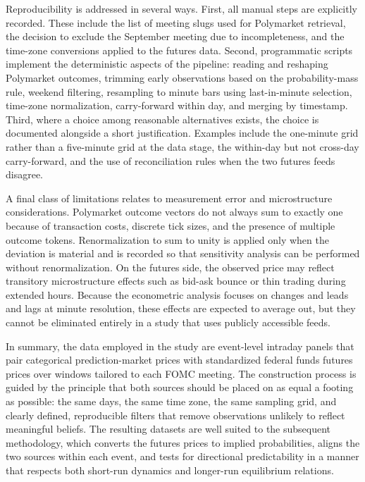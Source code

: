 Reproducibility is addressed in several ways. First, all manual steps are explicitly recorded. These include the list of meeting slugs used for Polymarket retrieval, the decision to exclude the September meeting due to incompleteness, and the time-zone conversions applied to the futures data. Second, programmatic scripts implement the deterministic aspects of the pipeline: reading and reshaping Polymarket outcomes, trimming early observations based on the probability-mass rule, weekend filtering, resampling to minute bars using last-in-minute selection, time-zone normalization, carry-forward within day, and merging by timestamp. Third, where a choice among reasonable alternatives exists, the choice is documented alongside a short justification. Examples include the one-minute grid rather than a five-minute grid at the data stage, the within-day but not cross-day carry-forward, and the use of reconciliation rules when the two futures feeds disagree.

A final class of limitations relates to measurement error and microstructure considerations. Polymarket outcome vectors do not always sum to exactly one because of transaction costs, discrete tick sizes, and the presence of multiple outcome tokens. Renormalization to sum to unity is applied only when the deviation is material and is recorded so that sensitivity analysis can be performed without renormalization. On the futures side, the observed price may reflect transitory microstructure effects such as bid-ask bounce or thin trading during extended hours. Because the econometric analysis focuses on changes and leads and lags at minute resolution, these effects are expected to average out, but they cannot be eliminated entirely in a study that uses publicly accessible feeds.

In summary, the data employed in the study are event-level intraday panels that pair categorical prediction-market prices with standardized federal funds futures prices over windows tailored to each FOMC meeting. The construction process is guided by the principle that both sources should be placed on as equal a footing as possible: the same days, the same time zone, the same sampling grid, and clearly defined, reproducible filters that remove observations unlikely to reflect meaningful beliefs. The resulting datasets are well suited to the subsequent methodology, which converts the futures prices to implied probabilities, aligns the two sources within each event, and tests for directional predictability in a manner that respects both short-run dynamics and longer-run equilibrium relations.
